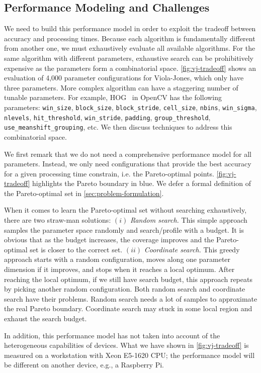 
\subsection{Performance Modeling and Challenges}

We need to build this performance model in order to exploit the tradeoff between
accuracy and processing times. Because each algorithm is fundamentally different
from another one, we must exhaustively evaluate all available algorithms. For
the same algorithm with different parameters, exhaustive search can be
prohibitively expensive as the parameters form a combinatorial
space. \autoref{fig:vj-tradeoff} shows an evaluation of 4,000 parameter
configurations for Viola-Jones, which only have three parameters. More complex
algorithm can have a staggering number of tunable parameters. For example,
HOG~\cite{dalal2005histograms} in OpenCV has the following parameters:
\texttt{win\_size}, \texttt{block\_size}, \texttt{block\_stride},
\texttt{cell\_size}, \texttt{nbins}, \texttt{win\_sigma}, \texttt{nlevels},
\texttt{hit\_threshold}, \texttt{win\_stride}, \texttt{padding},
\texttt{group\_threshold}, \texttt{use\_meanshift\_grouping}, etc. We then
discuss techniques to address this combinatorial space.

We first remark that we do not need a comprehensive performance model for all
parameters. Instead, we only need configurations that provide the best accuracy
for a given processing time constrain, i.e. the Pareto-optimal
points. \autoref{fig:vj-tradeoff} highlights the Pareto boundary in blue. We
defer a formal definition of the Pareto-optimal set in
\autoref{sec:problem-formulation}.

When it comes to learn the Pareto-optimal set without searching exhaustively,
there are two straw-man solutions: $(i)$ \textit{Random search.}  This simple
approach samples the parameter space randomly and search/profile with a
budget. It is obvious that as the budget increases, the coverage improves and
the Pareto-optimal set is closer to the correct set. $(ii)$ \textit{Coordinate
  search.} This greedy approach starts with a random configuration, moves along
one parameter dimension if it improves, and stops when it reaches a local
optimum. After reaching the local optimum, if we still have search budget, this
approach repeats by picking another random configuration. Both random search and
coordinate search have their problems. Random search needs a lot of samples to
approximate the real Pareto boundary. Coordinate search may stuck in some local
region and exhaust the search budget.

In addition, this performance model has not taken into account of the
heterogeneous capabilities of devices. What we have shown in
\autoref{fig:vj-tradeoff} is measured on a workstation with Xeon E5-1620 CPU;
the performance model will be different on another device, e.g., a Raspberry Pi.

